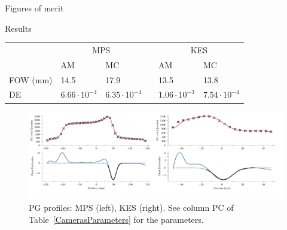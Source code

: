\documentclass[final]{beamer} %
\begin{document}
\begin{frame}{}
\begin{columns}[t]
\begin{column}{0.49\textwidth}
\begin{block}{Figures of merit}
	  \end{block}				
		

       
		
		\begin{block}{Results}
			{}
			\begin{table}[h]
			\centering
			\begin{tabular}{llllll}
				\midrule
							& \multicolumn{2}{c}{MPS}												&& \multicolumn{2}{c}{KES}										\\
				\cline{2-3}\cline{5-6}
							& AM 											& MC 									&& AM 										& MC								\\
				\midrule

				FOW (mm)& 14.5 								& 17.9  	 					&& 13.5 								& 13.8 						\\
				DE		& $6.66 \cdot 10^{-4}$  & $6.35 \cdot 10^{-4}$	&&	$1.06 \cdot 10^{-3}$   & $7.54 \cdot 10^{-4}$\\
				\midrule
			\end{tabular}
			\end{table}			
			{}
% 
% 				
% 

			
				\begin{figure}
					\includegraphics[width=\textwidth]{./figures/output-crop}			
					\caption{PG profiles: MPS (left), KES (right). See column PC of Table~\ref{CamerasParameters} for the parameters.}
					\label{PGprofiles}
				\end{figure}					
				

\end{block}
\end{column}
\end{columns}
\end{frame}
\end{document}
